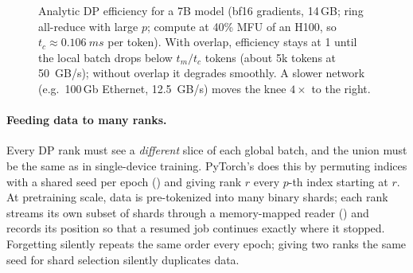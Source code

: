 \begin{figure}[t]
\centering
{}
\caption{Analytic DP efficiency for a 7B model (bf16 gradients, 14\,GB; ring all-reduce with
large $p$; compute at 40\% MFU of an H100, so $t_c\approx\SI{0.106}{ms}$ per token). With
overlap, efficiency stays at 1 until the local batch drops below $t_m/t_c$ tokens (about 5k
tokens at \SI{50}{GB/s}); without overlap it degrades smoothly. A slower network (e.g.\ 100\,Gb
Ethernet, \SI{12.5}{GB/s}) moves the knee $4\times$ to the right.}
\label{fig:dist:dpeff}
\end{figure}

\paragraph{Feeding data to many ranks.} Every DP rank must see a \emph{different} slice of
each global batch, and the union must be the same as in single-device training. PyTorch's
 does this by permuting indices with a shared seed per epoch
() and giving rank $r$ every $p$-th index starting at $r$. At
pretraining scale, data is pre-tokenized into many binary shards; each rank streams its own
subset of shards through a memory-mapped reader () and
records its position so that a resumed job continues exactly where it stopped. Forgetting
 silently repeats the same order every epoch; giving two ranks the same seed
for shard selection silently duplicates data.

